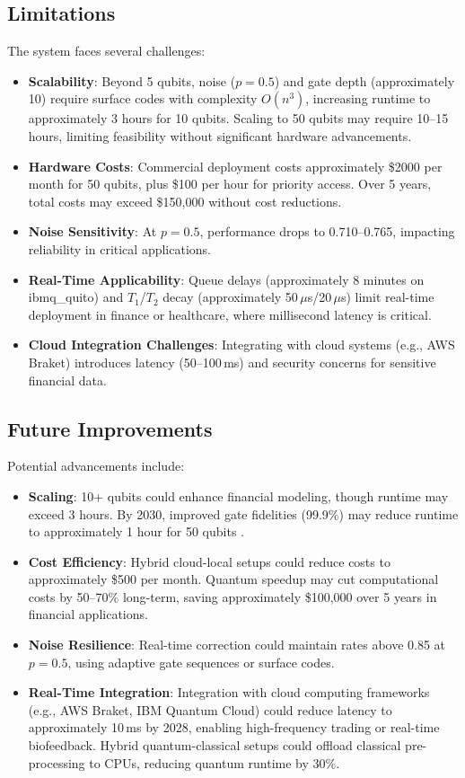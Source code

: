 \documentclass[12pt]{article}
\begin{document}
\subsection{Limitations}
The system faces several challenges:
\begin{itemize}[leftmargin=*, labelsep=0.5em]
    \item \textbf{Scalability}: Beyond 5 qubits, noise ($p=0.5$) and gate depth (approximately 10) require surface codes with complexity $O(n^3)$, increasing runtime to approximately 3 hours for 10 qubits. Scaling to 50 qubits may require 10--15 hours, limiting feasibility without significant hardware advancements.
    \item \textbf{Hardware Costs}: Commercial deployment costs approximately \$2000 per month for 50 qubits, plus \$100 per hour for priority access. Over 5 years, total costs may exceed \$150,000 without cost reductions.
    \item \textbf{Noise Sensitivity}: At $p=0.5$, performance drops to 0.710--0.765, impacting reliability in critical applications.
    \item \textbf{Real-Time Applicability}: Queue delays (approximately 8 minutes on ibmq\_quito) and $T_1$/$T_2$ decay (approximately 50\,$\mu$s/20\,$\mu$s) limit real-time deployment in finance or healthcare, where millisecond latency is critical.
    \item \textbf{Cloud Integration Challenges}: Integrating with cloud systems (e.g., AWS Braket) introduces latency (50--100\,ms) and security concerns for sensitive financial data.
\end{itemize}

\subsection{Future Improvements}
Potential advancements include:
\begin{itemize}[leftmargin=*, labelsep=0.5em]
    \item \textbf{Scaling}: 10+ qubits could enhance financial modeling, though runtime may exceed 3 hours. By 2030, improved gate fidelities (99.9\%) may reduce runtime to approximately 1 hour for 50 qubits \citep{google2024quantum}.
    \item \textbf{Cost Efficiency}: Hybrid cloud-local setups could reduce costs to approximately \$500 per month. Quantum speedup may cut computational costs by 50--70\% long-term, saving approximately \$100,000 over 5 years in financial applications.
    \item \textbf{Noise Resilience}: Real-time correction could maintain rates above 0.85 at $p=0.5$, using adaptive gate sequences or surface codes.
    \item \textbf{Real-Time Integration}: Integration with cloud computing frameworks (e.g., AWS Braket, IBM Quantum Cloud) could reduce latency to approximately 10\,ms by 2028, enabling high-frequency trading or real-time biofeedback. Hybrid quantum-classical setups could offload classical pre-processing to CPUs, reducing quantum runtime by 30\%.
\end{itemize}
\end{document}
